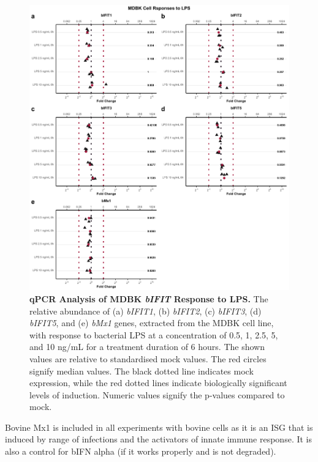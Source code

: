 \begin{figure}
    \centering
    \includegraphics[width=1\linewidth]{07. Chapter 2/Figs/02. Induction/02. mdbk_treat_lps.pdf}
    \caption[qPCR Analysis of MDBK \textit{bIFIT} Response to LPS.]{\textbf{qPCR Analysis of MDBK \textit{bIFIT} Response to LPS.} The relative abundance of (a) \textit{bIFIT1}, (b) \textit{bIFIT2}, (c) \textit{bIFIT3}, (d) \textit{bIFIT5}, and (e) \textit{bMx1} genes, extracted from the MDBK cell line, with response to bacterial LPS at a concentration of 0.5, 1, 2.5, 5, and 10 ng/mL for a treatment duration of 6 hours. The shown values are relative to standardised mock values. The red circles signify median values. The black dotted line indicates mock expression, while the red dotted lines indicate biologically significant levels of induction. Numeric values signify the p-values compared to mock.}
    \label{fig:MDBK responses to LPS}
\end{figure}

Bovine Mx1 is included in all experiments with bovine cells as it is an ISG that is induced by range of infections and the activators of innate immune response. It is also a control for bIFN alpha (if it works properly and is not degraded).

